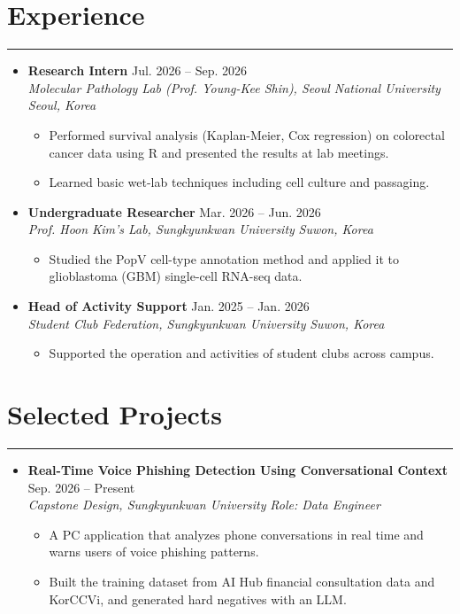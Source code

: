 \documentclass[letterpaper, 10pt]{article}
\begin{document}
\section*{Experience}
\hrule
\vspace{4pt}
\begin{itemize}
    \item[]
        \textbf{Research Intern} \hfill Jul. 2026 -- Sep. 2026 \\
        \textit{Molecular Pathology Lab (Prof. Young-Kee Shin), Seoul National University} \hfill \textit{Seoul, Korea}
        \begin{itemize}
            \item Performed survival analysis (Kaplan-Meier, Cox regression) on colorectal cancer data using R and presented the results at lab meetings.
            \item Learned basic wet-lab techniques including cell culture and passaging.
        \end{itemize}
    \item[]
        \textbf{Undergraduate Researcher} \hfill Mar. 2026 -- Jun. 2026 \\
        \textit{Prof. Hoon Kim's Lab, Sungkyunkwan University} \hfill \textit{Suwon, Korea}
        \begin{itemize}
            \item Studied the PopV cell-type annotation method and applied it to glioblastoma (GBM) single-cell RNA-seq data.
        \end{itemize}
    \item[]
        \textbf{Head of Activity Support} \hfill Jan. 2025 -- Jan. 2026 \\
        \textit{Student Club Federation, Sungkyunkwan University} \hfill \textit{Suwon, Korea}
        \begin{itemize}
            \item Supported the operation and activities of student clubs across campus.
        \end{itemize}
\end{itemize}

\section*{Selected Projects}
\hrule
\vspace{4pt}
\begin{itemize}
    \item[]
        \textbf{Real-Time Voice Phishing Detection Using Conversational Context} \hfill Sep. 2026 -- Present \\
        \textit{Capstone Design, Sungkyunkwan University} \hfill \textit{Role: Data Engineer}
        \begin{itemize}
            \item A PC application that analyzes phone conversations in real time and warns users of voice phishing patterns.
            \item Built the training dataset from AI Hub financial consultation data and KorCCVi, and generated hard negatives with an LLM.
        \end{itemize}
\end{itemize}
\end{document}

